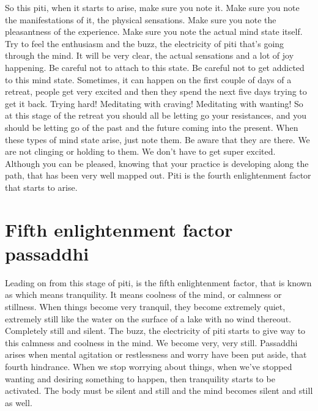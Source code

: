 \documentclass[letterpaper,10pt,english]{sphinxmanual}
\begin{document}
\sphinxAtStartPar
So this piti, when it starts to arise, make sure you note it. Make sure
you  note  the  manifestations  of  it,  the  physical  sensations.  Make  sure  you
note the pleasantness of the experience. Make sure you note the actual mind
state  itself. Try  to  feel  the  enthusiasm  and  the  buzz,  the  electricity  of  piti
that’s going through the mind. It will be very clear, the actual sensations and
a lot of joy happening. Be careful not to attach to this state. Be careful not to
get addicted to this mind state. Sometimes, it can happen on the first couple
of days of a retreat, people get very excited and then they spend the next five
days trying to get it back. Trying hard! Meditating with craving! Meditating
with wanting! So at this stage of the retreat you should all be letting go your
resistances, and you should be letting go of the past and the future coming
into  the  present. When  these  types  of  mind  state  arise,  just  note  them.  Be
aware that they are there. We are not clinging or holding to them. We don’t
have to get super excited. Although you can be pleased, knowing that your
practice is developing along the path, that has been very well mapped out.
Piti is the fourth enlightenment factor that starts to arise.


\section{Fifth enlightenment factor passaddhi}
\label{\detokenize{6-a:fifth-enlightenment-factor-passaddhi}}
\sphinxAtStartPar
Leading  on  from  this  stage  of  piti,  is  the  fifth  enlightenment  factor,
that is known as
which means tranquility. It means coolness of
the mind, or calmness or stillness. When things become very tranquil, they
  become  extremely  quiet,  extremely  still  like  the  water  on  the  surface  of  a
lake with no wind thereout. Completely still and silent. The buzz, the electricity of piti starts to give way to this calmness and coolness in the mind. We
become very, very still. Passaddhi arises when mental agitation or restlessness and worry have been put aside, that fourth hindrance. When we stop
worrying about things, when we’ve stopped wanting and desiring something
to happen, then tranquility starts to be activated. The body must be silent and
still and the mind becomes silent and still as well.
\end{document}
